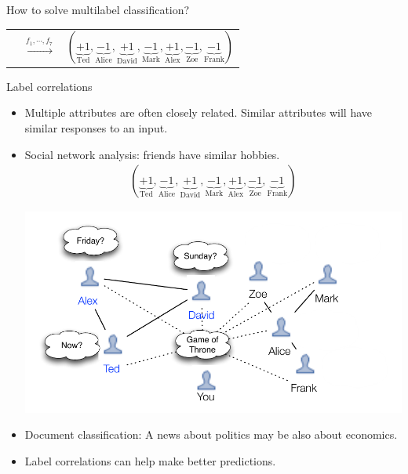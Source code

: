 \documentclass[first=purple,second=dgreen,logo=redexc]{aaltoslides}
\begin{document}
{\begin{frame}{How to solve multilabel classification?}
\begin{center}
{\begin{tabular}{p{1.5cm}p{0.5cm}p{3cm}}
		& $\overset{f_1,\cdots,f_7}{\rightarrow}$ &$(\underbrace{+1}_{\text{Ted}},\underbrace{-1}_{\text{Alice}},\underbrace{+1}_{\text{David}},\underbrace{-1}_{\text{Mark}},\underbrace{+1}_{\text{Alex}},\underbrace{-1}_{\text{Zoe}},\underbrace{-1}_{\text{Frank}})$\\
	    \end{tabular}
		}
	\end{center}
\end{frame}


\begin{frame}{Label correlations}
	\begin{itemize}
		\item Multiple attributes are often closely related. Similar attributes will have similar responses to an input.
		\item Social network analysis: friends have similar hobbies.
		\begin{align*}
	(\underbrace{+1}_{\text{Ted}},\underbrace{-1}_{\text{Alice}},\underbrace{+1}_{\text{David}},\underbrace{-1}_{\text{Mark}},\underbrace{+1}_{\text{Alex}},\underbrace{-1}_{\text{Zoe}},\underbrace{-1}_{\text{Frank}})
		\end{align*}
		\begin{center}
			\includegraphics[scale=0.5]{./figures/facebooknetwork.pdf}
		\end{center}
		\item Document classification: A news about politics may be also about economics. 
		\item Label correlations can help make better predictions.
	\end{itemize}
\end{frame}


}
\end{document}
